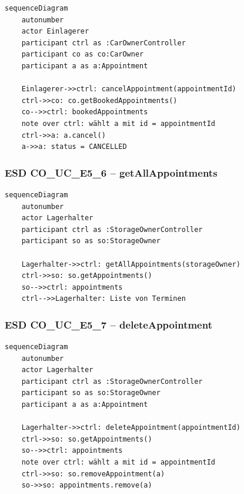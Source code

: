 \begin{lstlisting}[basicstyle=\ttfamily\small, breaklines=true]
sequenceDiagram
    autonumber
    actor Einlagerer
    participant ctrl as :CarOwnerController
    participant co as co:CarOwner
    participant a as a:Appointment

    Einlagerer->>ctrl: cancelAppointment(appointmentId)
    ctrl->>co: co.getBookedAppointments()
    co-->>ctrl: bookedAppointments
    note over ctrl: wählt a mit id = appointmentId
    ctrl->>a: a.cancel()
    a->>a: status = CANCELLED
\end{lstlisting}

\newpage

{}
\subsubsection*{ESD CO\_UC\_E5\_6 – getAllAppointments}

\begin{lstlisting}[basicstyle=\ttfamily\small, breaklines=true]
sequenceDiagram
    autonumber
    actor Lagerhalter
    participant ctrl as :StorageOwnerController
    participant so as so:StorageOwner

    Lagerhalter->>ctrl: getAllAppointments(storageOwner)
    ctrl->>so: so.getAppointments()
    so-->>ctrl: appointments
    ctrl-->>Lagerhalter: Liste von Terminen
\end{lstlisting}

\newpage

{}
\subsubsection*{ESD CO\_UC\_E5\_7 – deleteAppointment}

\begin{lstlisting}[basicstyle=\ttfamily\small, breaklines=true]
sequenceDiagram
    autonumber
    actor Lagerhalter
    participant ctrl as :StorageOwnerController
    participant so as so:StorageOwner
    participant a as a:Appointment

    Lagerhalter->>ctrl: deleteAppointment(appointmentId)
    ctrl->>so: so.getAppointments()
    so-->>ctrl: appointments
    note over ctrl: wählt a mit id = appointmentId
    ctrl->>so: so.removeAppointment(a)
    so->>so: appointments.remove(a)
\end{lstlisting}

